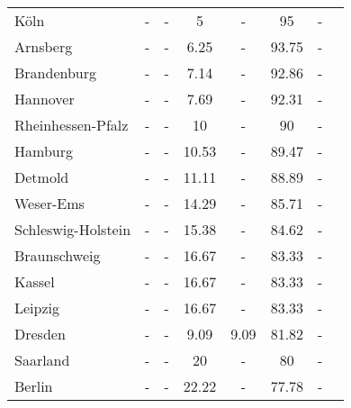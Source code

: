 \begin{table}[H]
\begin{tabularx}{\textwidth}{Xccccccc}
            Köln & - & - & 5 & - & 95 & - \\
            Arnsberg & - & - & 6.25 & - & 93.75 & - \\
            Brandenburg & - & - & 7.14 & - & 92.86 & - \\
            Hannover & - & - & 7.69 & - & 92.31 & - \\
            Rheinhessen-Pfalz & - & - & 10 & - & 90 & - \\
            Hamburg & - & - & 10.53 & - & 89.47 & - \\
            Detmold & - & - & 11.11 & - & 88.89 & - \\
            Weser-Ems & - & - & 14.29 & - & 85.71 & - \\
            Schleswig-Holstein & - & - & 15.38 & - & 84.62 & - \\
            Braunschweig & - & - & 16.67 & - & 83.33 & - \\
            Kassel & - & - & 16.67 & - & 83.33 & - \\
            Leipzig & - & - & 16.67 & - & 83.33 & - \\
            Dresden & - & - & 9.09 & 9.09 & 81.82 & - \\
            Saarland & - & - & 20 & - & 80 & - \\
            Berlin & - & - & 22.22 & - & 77.78 & - \\
        \bottomrule
    \end{tabularx}
\end{table}
    